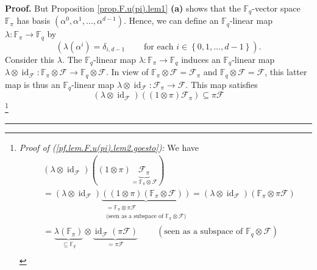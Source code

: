 \documentclass[numbers=enddot,12pt,final,onecolumn,notitlepage]{scrartcl}%
\theoremstyle{definition}
\newenvironment{proof}[1][Proof]{\noindent\textbf{#1.} }{\ \rule{0.5em}{0.5em}}
\begin{document}
\begin{proof}
But Proposition \ref{prop.F.u(pi).lem1} \textbf{(a)} shows that the
$\mathbb{F}_{q}$-vector space $\mathbb{F}_{\pi}$ has basis $\left(  \alpha
^{0},\alpha^{1},\ldots,\alpha^{d-1}\right)  $. Hence, we can define an
$\mathbb{F}_{q}$-linear map $\lambda:\mathbb{F}_{\pi}\rightarrow\mathbb{F}%
_{q}$ by%
\begin{equation}
\left(  \lambda\left(  \alpha^{i}\right)  =\delta_{i,d-1}%
\ \ \ \ \ \ \ \ \ \ \text{for each }i\in\left\{  0,1,\ldots,d-1\right\}
\right)  . \label{pf.lem.F.u(pi).lem2.lambda}%
\end{equation}
Consider this $\lambda$. The $\mathbb{F}_{q}$-linear map $\lambda
:\mathbb{F}_{\pi}\rightarrow\mathbb{F}_{q}$ induces an $\mathbb{F}_{q}$-linear
map $\lambda\otimes\operatorname*{id}\nolimits_{\mathcal{F}}:\mathbb{F}_{\pi
}\otimes\mathcal{F}\rightarrow\mathbb{F}_{q}\otimes\mathcal{F}$. In view of
$\mathbb{F}_{\pi}\otimes\mathcal{F}=\mathcal{F}_{\pi}$ and $\mathbb{F}%
_{q}\otimes\mathcal{F}=\mathcal{F}$, this latter map is thus an $\mathbb{F}%
_{q}$-linear map $\lambda\otimes\operatorname*{id}\nolimits_{\mathcal{F}%
}:\mathcal{F}_{\pi}\rightarrow\mathcal{F}$. This map satisfies%
\begin{equation}
\left(  \lambda\otimes\operatorname*{id}\nolimits_{\mathcal{F}}\right)
\left(  \left(  1\otimes\pi\right)  \mathcal{F}_{\pi}\right)  \subseteq
\pi\mathcal{F} \label{pf.lem.F.u(pi).lem2.goesto}%
\end{equation}
\footnote{\textit{Proof of (\ref{pf.lem.F.u(pi).lem2.goesto}):} We have%
\begin{align*}
&  \left(  \lambda\otimes\operatorname*{id}\nolimits_{\mathcal{F}}\right)
\left(  \left(  1\otimes\pi\right)  \underbrace{\mathcal{F}_{\pi}%
}_{=\mathbb{F}_{\pi}\otimes\mathcal{F}}\right) \\
&  =\left(  \lambda\otimes\operatorname*{id}\nolimits_{\mathcal{F}}\right)
\underbrace{\left(  \left(  1\otimes\pi\right)  \left(  \mathbb{F}_{\pi
}\otimes\mathcal{F}\right)  \right)  }_{\substack{=\mathbb{F}_{\pi}\otimes
\pi\mathcal{F}\\\text{(seen as a subspace of }\mathbb{F}_{\pi}\otimes
\mathcal{F}\text{)}}}=\left(  \lambda\otimes\operatorname*{id}%
\nolimits_{\mathcal{F}}\right)  \left(  \mathbb{F}_{\pi}\otimes\pi
\mathcal{F}\right) \\
&  =\underbrace{\lambda\left(  \mathbb{F}_{\pi}\right)  }_{\subseteq
\mathbb{F}_{q}}\otimes\underbrace{\operatorname*{id}\nolimits_{\mathcal{F}%
}\left(  \pi\mathcal{F}\right)  }_{=\pi\mathcal{F}}\ \ \ \ \ \ \ \ \ \ \left(
\text{seen as a subspace of }\mathbb{F}_{q}\otimes\mathcal{F}\right) \\

\end{align*}}
\end{proof}
\end{document}
